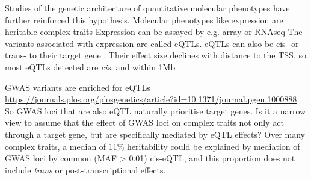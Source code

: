 \begin{outline}
\1 Studies of the genetic architecture of quantitative molecular phenotypes have further reinforced this hypothesis.
    \2 Molecular phenotypes like expression are heritable complex traits \autocite{gaffney2013GlobalPropertiesFunctional}
    \2 Expression can be assayed by e.g. array or RNAseq
    \2 The variants associated with expression are called \glspl{eQTL}.
    \2 eQTLs can also be cis- or trans- to their target gene \autocite{albert2015RoleRegulatoryVariation}.
    \2 Their effect size declines with distance to the TSS, so most eQTLs detected are \textit{cis}, and within 1Mb \autocite{vandiedonck2017GeneticAssociationMolecular}

\1 GWAS variants are enriched for eQTLs \url{https://journals.plos.org/plosgenetics/article?id=10.1371/journal.pgen.1000888}
    \2 So GWAS loci that are also eQTL naturally prioritise target genes.
    \2 Is it a narrow view to assume that the effect of GWAS loci on complex traits not only act through a target gene, but are specifically mediated by eQTL effects?
    \2 Over many complex traits, a median of 11\% heritability could be explained by mediation of GWAS loci by common (MAF > 0.01) cis-eQTL, 
    and this proportion does not include \textit{trans} or post-transcriptional effects.


\end{outline}
